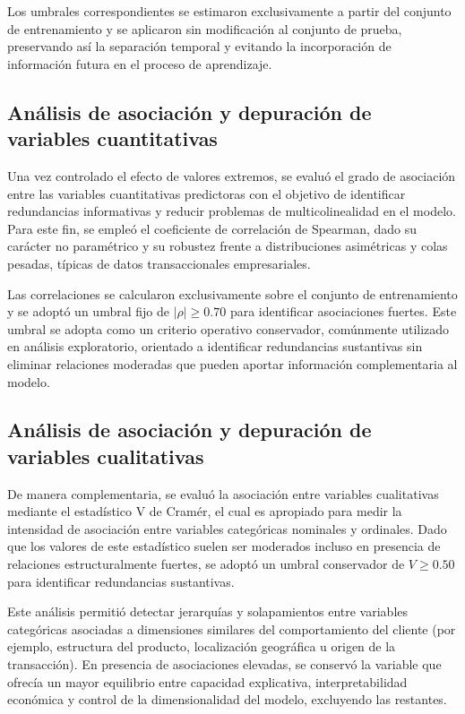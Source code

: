     Los umbrales correspondientes se estimaron exclusivamente a partir del conjunto de entrenamiento y se aplicaron sin modificación al conjunto de prueba, preservando así la separación temporal y evitando la incorporación de información futura en el proceso de aprendizaje.

\subsection{Análisis de asociación y depuración de variables cuantitativas}

    Una vez controlado el efecto de valores extremos, se evaluó el grado de asociación entre las variables cuantitativas predictoras con el objetivo de identificar redundancias informativas y reducir problemas de multicolinealidad en el modelo. Para este fin, se empleó el coeficiente de correlación de Spearman, dado su carácter no paramétrico y su robustez frente a distribuciones asimétricas y colas pesadas, típicas de datos transaccionales empresariales.
    
    Las correlaciones se calcularon exclusivamente sobre el conjunto de entrenamiento y se adoptó un umbral fijo de $|\rho| \geq 0.70$ para identificar asociaciones fuertes. 
    Este umbral se adopta como un criterio operativo conservador, comúnmente utilizado en análisis exploratorio, orientado a identificar redundancias sustantivas sin eliminar relaciones moderadas que pueden aportar información complementaria al modelo.


\subsection{Análisis de asociación y depuración de variables cualitativas}

    De manera complementaria, se evaluó la asociación entre variables cualitativas mediante el estadístico V de Cramér, el cual es apropiado para medir la intensidad de asociación entre variables categóricas nominales y ordinales. Dado que los valores de este estadístico suelen ser moderados incluso en presencia de relaciones estructuralmente fuertes, se adoptó un umbral conservador de $V \geq 0.50$ para identificar redundancias sustantivas.
    
    Este análisis permitió detectar jerarquías y solapamientos entre variables categóricas asociadas a dimensiones similares del comportamiento del cliente (por ejemplo, estructura del producto, localización geográfica u origen de la transacción). En presencia de asociaciones elevadas, se conservó la variable que ofrecía un mayor equilibrio entre capacidad explicativa, interpretabilidad económica y control de la dimensionalidad del modelo, excluyendo las restantes.
    
